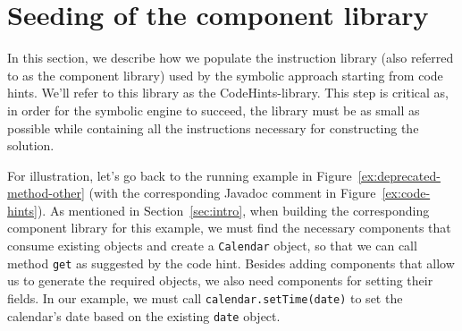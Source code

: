 \documentclass[sigconf]{acmart}
\begin{document}


\section{Seeding of the component library} \label{sec:components-seeding}

In this section, we describe how we populate the instruction library (also referred to as the component library)
used by the symbolic approach starting from code hints. We'll refer to this library as the CodeHints-library.
This step is critical as, in order for the symbolic engine to succeed, the library must be as small as possible
while containing all the instructions necessary
for constructing the solution.

For illustration, let's go back to the running example in Figure~\ref{ex:deprecated-method-other} (with the corresponding Javadoc comment in Figure~\ref{ex:code-hints}).
%
As mentioned in Section~\ref{sec:intro}, when building the corresponding component library for this example,
%
we must find the necessary
components that consume existing objects and create a \lstinline[breaklines=true]{Calendar} object, so that we can call method \lstinline[breaklines=true]{get} as suggested by the code hint.
Besides adding components that allow us to generate the required objects, we also need components for setting their
fields. In our example, we must call
\lstinline[breaklines=true]{calendar.setTime(date)} to set the calendar's date
based on the existing \lstinline[breaklines=true]{date} object.
\end{document}
